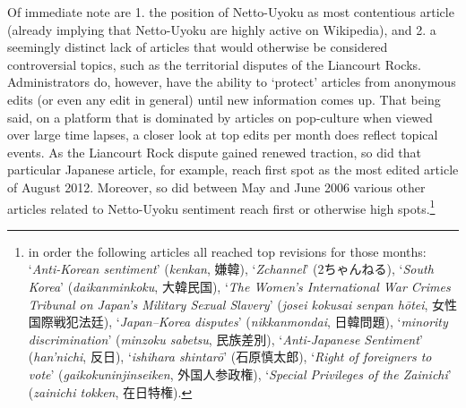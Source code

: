 \documentclass[10pt,british,A4paper,oneside]{memoir}
\begin{document}
Of immediate note are 1. the position of Netto-Uyoku as  most
contentious article (already implying that Netto-Uyoku are highly active
on Wikipedia), and 2. a seemingly distinct lack of articles that would
otherwise be considered controversial topics, such as the territorial
disputes of the Liancourt Rocks. Administrators do, however, have the
ability to `protect' articles from anonymous edits (or even any edit in
general) until new information comes up. That being said, on a platform
that is dominated by articles on pop-culture when viewed over large time
lapses, a closer look at top edits per month does reflect topical
events. As the Liancourt Rock dispute gained renewed traction, so did that particular
Japanese article, for example, reach first spot
as the most edited article of August 2012. Moreover, so did between May
and June 2006 various other articles related to Netto-Uyoku sentiment
reach first or otherwise high spots.\footnote{in order the following
  articles all reached top revisions for those months:
  `\emph{Anti-Korean sentiment}' (\emph{kenkan}, 嫌韓),
  `\emph{Zchannel}' (2ちゃんねる), `\emph{South Korea}'
  (\emph{daikanminkoku}, 大韓民国), `\emph{The Women's International War
  Crimes Tribunal on Japan's Military Sexual Slavery}' (\emph{josei
  kokusai senpan hōtei}, 女性国際戦犯法廷), `\emph{Japan--Korea
  disputes}' (\emph{nikkanmondai}, 日韓問題), `\emph{minority
  discrimination}' (\emph{minzoku sabetsu}, 民族差別),
  `\emph{Anti-Japanese Sentiment}' (\emph{han'nichi}, 反日),
  `\emph{ishihara shintarō}' (石原慎太郎), `\emph{Right of foreigners to
  vote}' (\emph{gaikokuninjinseiken}, 外国人参政権), `\emph{Special
  Privileges of the Zainichi}' (\emph{zainichi tokken}, 在日特権).}
\end{document}
